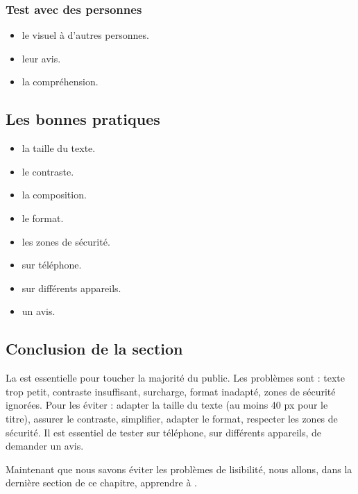 \subsubsection{Test avec des personnes}

\begin{itemize}
    \item {} le visuel à d'autres personnes.
    \item {} leur avis.
    \item {} la compréhension.
\end{itemize}

\subsection{Les bonnes pratiques}

\begin{itemize}
    \item {} la taille du texte.
    \item {} le contraste.
    \item {} la composition.
    \item {} le format.
    \item {} les zones de sécurité.
    \item {} sur téléphone.
    \item {} sur différents appareils.
    \item {} un avis.
\end{itemize}

\subsection*{Conclusion de la section}

La  est essentielle pour toucher la majorité du public. Les problèmes sont : texte trop petit, contraste insuffisant, surcharge, format inadapté, zones de sécurité ignorées. Pour les éviter : adapter la taille du texte (au moins 40 px pour le titre), assurer le contraste, simplifier, adapter le format, respecter les zones de sécurité. Il est essentiel de tester sur téléphone, sur différents appareils, de demander un avis.

Maintenant que nous savons éviter les problèmes de lisibilité, nous allons, dans la dernière section de ce chapitre, apprendre à .

